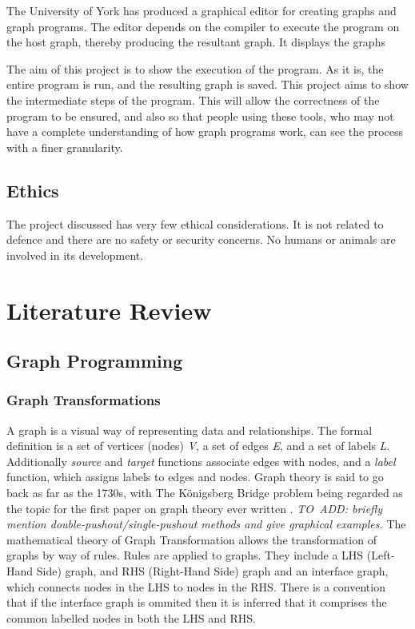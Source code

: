 \documentclass{UoYCSproject}
\begin{document}
The University of York has produced a graphical editor for creating graphs and graph programs. The editor depends on the compiler to execute the program on the host graph, thereby producing the resultant graph. It displays the graphs %

The aim of this project is to show the execution of the program. As it is, the entire program is run, and the resulting graph is saved. This project aims to show the intermediate steps of the program. This will allow the correctness of the program to be ensured, and also so that people using these tools, who may not have a complete understanding of how graph programs work, can see the process with a finer granularity.

\section{Ethics}
The project discussed has very few ethical considerations. It is not related to defence and there are no safety or security concerns. No humans or animals are involved in its development.

\chapter{Literature Review}
\section{Graph Programming}
\subsection{Graph Transformations}
A graph is a visual way of representing data and relationships. The formal definition is a set of vertices (nodes) \emph{V}, a set of edges \emph{E}, and a set of labels \emph{L}. Additionally \emph{source} and \emph{target} functions associate edges with nodes, and a \emph{label} function, which assigns labels to edges and nodes.
Graph theory is said to go back as far as the 1730s, with The K{\"o}nigsberg Bridge problem being regarded as the topic for the first paper on graph theory ever written \cite{grathe_origin}.
\emph{TO~ADD: briefly mention double-pushout/single-pushout methods and give graphical examples.} %
The mathematical theory of Graph Transformation allows the transformation of graphs by way of rules. Rules are applied to graphs. They include a LHS (Left-Hand Side) graph, and RHS (Right-Hand Side) graph and an interface graph, which connects nodes in the LHS to nodes in the RHS. There is a convention that if the interface graph is ommited then it is inferred that it comprises the common labelled nodes in both the LHS and RHS.
\end{document}
